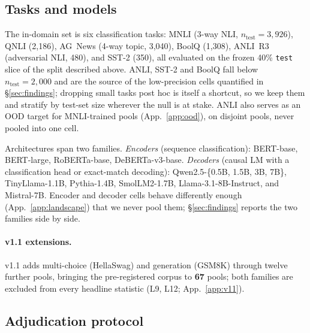 \documentclass[11pt]{article}
\begin{document}
\subsection{Tasks and models}

The in-domain set is six classification tasks: MNLI (3-way NLI, $n_{\text{test}}{=}3{,}926$), QNLI (2{,}186), AG~News (4-way topic, 3{,}040), BoolQ (1{,}308), ANLI~R3 (adversarial NLI, 480), and SST-2 (350), all evaluated on the frozen 40\% \texttt{test} slice of the split described above. ANLI, SST-2 and BoolQ fall below $n_{\text{test}}{=}2{,}000$ and are the source of the low-precision cells quantified in \S\ref{sec:findings}; dropping small tasks post hoc is itself a shortcut, so we keep them and stratify by test-set size wherever the null is at stake. ANLI also serves as an OOD target for MNLI-trained pools (App.~\ref{app:ood}), on disjoint pools, never pooled into one cell.

Architectures span two families. \emph{Encoders} (sequence classification): BERT-base, BERT-large, RoBERTa-base, DeBERTa-v3-base. \emph{Decoders} (causal LM with a classification head or exact-match decoding): Qwen2.5-\{0.5B, 1.5B, 3B, 7B\}, TinyLlama-1.1B, Pythia-1.4B, SmolLM2-1.7B, Llama-3.1-8B-Instruct, and Mistral-7B. Encoder and decoder cells behave differently enough (App.~\ref{app:landscape}) that we never pool them; \S\ref{sec:findings} reports the two families side by side.

\paragraph{v1.1 extensions.} v1.1 adds multi-choice (HellaSwag) and generation (GSM8K) through twelve further pools, bringing the pre-registered corpus to \textbf{67} pools; both families are excluded from every headline statistic (L9, L12; App.~\ref{app:v11}).

\subsection{Adjudication protocol}
\end{document}
